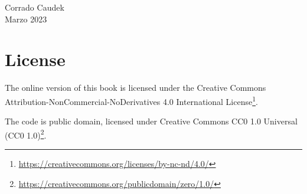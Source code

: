\documentclass[
]{book}
\renewcommand{\href}[2]{#2\footnote{\url{#1}}}
\begin{document}
\begin{flushright}
Corrado Caudek\\
Marzo 2023 \end{flushright}

\hypertarget{license}{%
\section*{License}\label{license}}


The online version of this book is licensed under the \href{https://creativecommons.org/licenses/by-nc-nd/4.0/}{Creative Commons Attribution-NonCommercial-NoDerivatives 4.0 International License}.

The code is public domain, licensed under \href{https://creativecommons.org/publicdomain/zero/1.0/}{Creative Commons CC0 1.0 Universal (CC0 1.0)}.

  

\printindex
\end{document}
